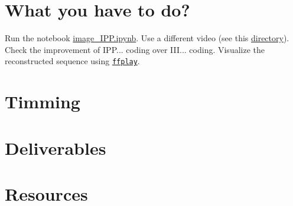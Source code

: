 \section{What you have to do?}

Run the notebook \href{https://github.com/Sistemas-Multimedia/MRVC/blob/master/src/image_IPP.ipynb}{image\_IPP.ipynb}. Use a different video (see
this
\href{https://github.com/Sistemas-Multimedia/MRVC/tree/master/sequences}{directory}). Check
the improvement of IPP... coding over III... coding. Visualize the
reconstructed sequence using \href{https://ffmpeg.org/ffplay.html}{\texttt{ffplay}}.

\section{Timming}

\section{Deliverables}

\section{Resources}

\renewcommand{\addcontentsline}[3]{}%

